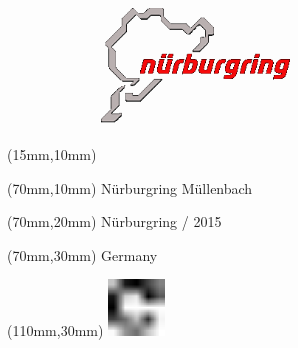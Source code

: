 \null\newpage
\begin{textblock*}{50mm}(15mm,10mm)%
\includegraphics[width=50mm]{LG/NUR.png}
\end{textblock*}
\begin{textblock*}{130mm}(70mm,10mm)%
{\fontsize{20}{20}\selectfont Nürburgring Müllenbach}\\
\end{textblock*}
\begin{textblock*}{120mm}(70mm,20mm)%
{\fontsize{16}{16}\selectfont Nürburgring / 2015}\\
\end{textblock*}
\begin{textblock*}{120mm}(70mm,30mm)%
{\fontsize{12}{12}\selectfont Germany}
\end{textblock*}
\begin{textblock*}{30mm}(110mm,30mm)%
\centering
\includegraphics[height=15mm]{icons/fa-rotate-right.pdf}
\end{textblock*}
